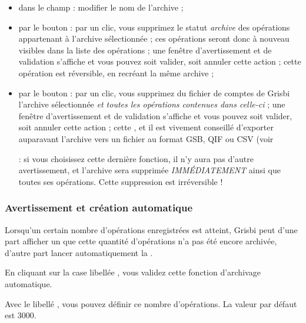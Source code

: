 \begin{itemize}
	\item dans le champ  : modifier le nom de l'archive ;	
	\item par le bouton  : par un clic, vous supprimez le statut \emph{archive} des opérations appartenant à l'archive sélectionnée ; ces opérations seront donc à nouveau visibles dans la liste des opérations ;  une fenêtre d'avertissement et de validation s'affiche et vous pouvez soit valider, soit annuler cette action ; cette opération est réversible, en recréant la même archive ;
	\item par le bouton  : par un clic, vous  supprimez du fichier de comptes de Grisbi l'archive sélectionnée \emph{et toutes les opérations contenues dans celle-ci} ; une fenêtre d'avertissement et de validation s'affiche et vous pouvez soit valider, soit annuler cette action ; cette , et il est vivement conseillé d'exporter auparavant l'archive vers un fichier au format \gls{GSB}, \gls{QIF} ou \gls{CSV} (voir 

 :  si vous choisissez cette dernière fonction, il n'y aura pas d'autre avertissement, et l'archive sera supprimée \emph{IMMÉDIATEMENT} ainsi que toutes ses opérations. Cette suppression est irréversible !
\end{itemize}


\subsubsection{Avertissement et création automatique\label{setup-general-archives-create}}

Lorsqu'un certain nombre d'opérations enregistrées est atteint, Grisbi peut d'une part afficher un   que cette quantité d'opérations n'a pas été encore archivée, d'autre part lancer automatiquement la .

En cliquant sur la case libellée , vous validez cette fonction d'archivage automatique.

Avec le libellé , vous pouvez définir ce nombre d'opérations. La valeur par défaut est 3000.


